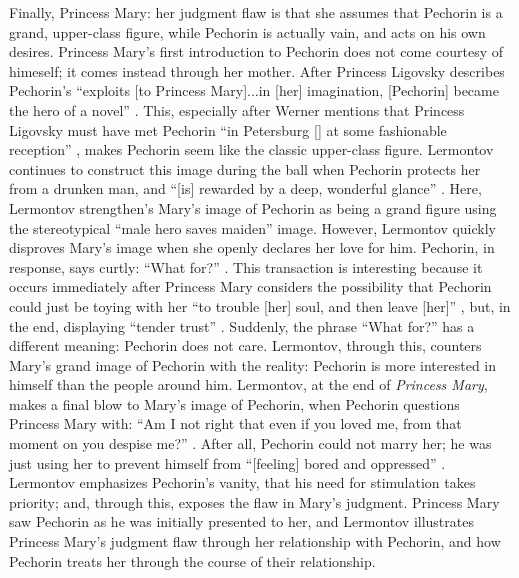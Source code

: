 \documentclass[a4paper,12pt]{article}
\newcommand{\mcite}{\mancite\cite}
\begin{document}

    Finally, Princess Mary: her judgment flaw is that she assumes that Pechorin is a grand,
    upper-class figure, while Pechorin is actually vain, and acts on his own desires.
    Princess Mary's first introduction to Pechorin does not come courtesy of himeself; it comes
    instead through her mother. After Princess Ligovsky describes Pechorin's ``exploits [to Princess
    Mary]...in [her] imagination, [Pechorin] became the hero of a novel'' \mcite[93]{book}. This,
    especially after Werner mentions that Princess Ligovsky must have met Pechorin ``in Petersburg
    [] at some fashionable reception'' \mcite[93]{book}, makes Pechorin seem like the classic
    upper-class figure. Lermontov continues to construct this image during the ball when Pechorin
    protects her from a drunken man, and ``[is] rewarded by a deep, wonderful glance'' \mcite[109]{book}.
    Here, Lermontov strengthen's Mary's image of Pechorin as being a grand figure using the stereotypical
    ``male hero saves maiden'' image. However, Lermontov quickly disproves Mary's image when she
    openly declares her love for him. Pechorin, in response, says curtly: ``What for?'' \mcite[133]{book}.
    This transaction is interesting because it occurs immediately after Princess Mary considers the
    possibility that Pechorin could just be toying with her ``to trouble [her] soul, and then leave
    [her]'' \mcite[133]{book}, but, in the end, displaying ``tender trust'' \mcite[133]{book}. Suddenly,
    the phrase ``What for?'' has a different meaning: Pechorin does not care. Lermontov, through
    this, counters Mary's grand image of Pechorin with the reality: Pechorin is more interested in
    himself than the people around him. Lermontov, at the end of \textit{Princess Mary}, makes a
    final blow to Mary's image of Pechorin, when Pechorin questions Princess Mary with: ``Am I not
    right that even if you loved me, from that moment on you despise me?'' \mcite[162]{book}. After
    all, Pechorin could not marry her; he was just using her to prevent himself from ``[feeling]
    bored and oppressed'' \mcite[162]{book}. Lermontov emphasizes Pechorin's vanity, that his need
    for stimulation takes priority; and, through this, exposes the flaw in Mary's judgment.
    Princess Mary saw Pechorin as he was initially presented to her, and Lermontov illustrates Princess
    Mary's judgment flaw through her relationship with Pechorin, and how Pechorin treats her through
    the course of their relationship.
\end{document}
